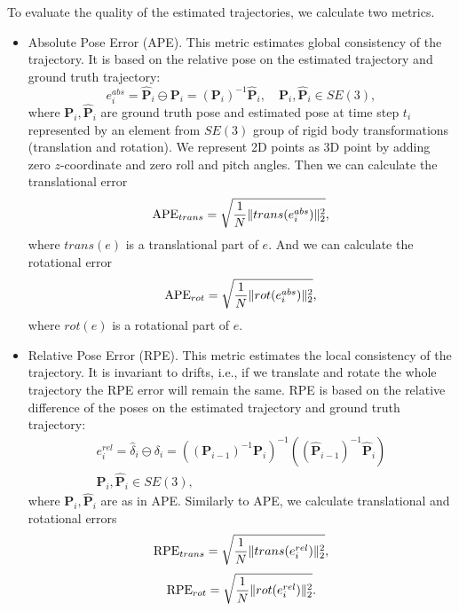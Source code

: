 To evaluate the quality of the estimated trajectories, we calculate
two metrics.
\begin{itemize}
    \item Absolute Pose Error (APE).
    This metric estimates global consistency of the trajectory.
    It is based on the relative pose on the estimated trajectory and ground truth trajectory:
    \[
        e_i^{abs} = \widehat{\mathbf{P}}_i \ominus \mathbf{P}_i =
        \left ( \mathbf{P}_i \right )^{-1} \widehat{\mathbf{P}}_i,
        \quad
        \mathbf{P}_i, \widehat{\mathbf{P}}_i \in SE(3),
    \]
    where $\mathbf{P}_i, \widehat{\mathbf{P}}_i$ are ground truth pose and estimated
    pose at time step $t_i$ represented by an element from $SE(3)$ group of rigid body transformations (translation and rotation).
    We represent 2D points as 3D point by adding zero $z$-coordinate and zero roll and pitch
    angles.
    Then we can calculate the translational error
    \[
        {\rm APE}_{trans} = \sqrt{\frac{1}{N} \|trans(e_i^{abs})\|_2^2},
    \]
    where $trans(e)$ is a translational part of $e$.
    And we can calculate the rotational error
    \[
        {\rm APE}_{rot} = \sqrt{\frac{1}{N} \|rot(e_i^{abs})\|_2^2},
    \]
    where $rot(e)$ is a rotational part of $e$.

    \item Relative Pose Error (RPE).
    This metric estimates the local consistency of the trajectory.
    It is invariant to drifts, i.e., if we translate and rotate the whole trajectory
    the RPE error will remain the same.
    RPE is based on the relative difference of the poses on the estimated trajectory and
    ground truth trajectory:
    \begin{align*}
        e_i^{rel} = \hat{\delta}_i \ominus \delta_i =
        \left (
            \left ( \mathbf{P}_{i - 1} \right )^{-1} \mathbf{P}_i
        \right )^{-1}
        \left (
            \left ( \widehat{\mathbf{P}}_{i - 1} \right )^{-1} \widehat{\mathbf{P}}_i
        \right )
        \\
        \mathbf{P}_i, \widehat{\mathbf{P}}_i \in SE(3),
    \end{align*}
    where $\mathbf{P}_i, \widehat{\mathbf{P}}_i$ are as in APE.
    Similarly to APE, we calculate translational and rotational errors
    \[
        {\rm RPE}_{trans} = \sqrt{\frac{1}{N} \|trans(e_i^{rel})\|_2^2},
    \]
    \[
        {\rm RPE}_{rot} = \sqrt{\frac{1}{N} \|rot(e_i^{rel})\|_2^2}.
    \]
\end{itemize}


